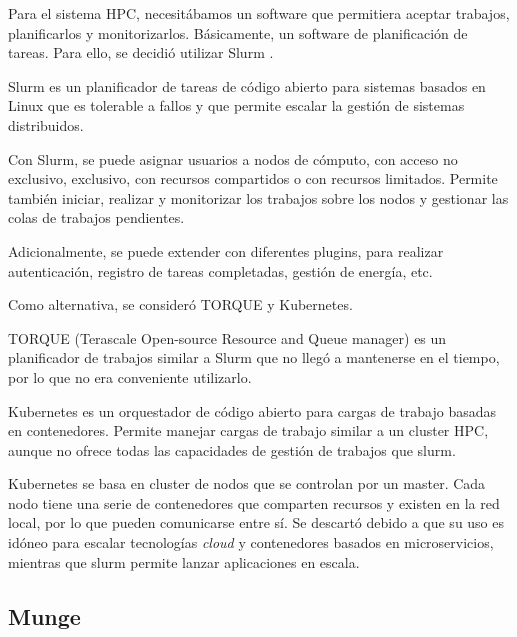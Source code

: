 Para el sistema HPC, necesitábamos un software que permitiera aceptar trabajos, planificarlos y monitorizarlos. Básicamente, un software de planificación de tareas. Para ello, se decidió utilizar Slurm \cite{slurmquickstart}.
\vspace{2mm}

Slurm es un planificador de tareas de código abierto \cite{slurmrepo} para sistemas basados en Linux que es tolerable a fallos y que permite escalar la gestión de sistemas distribuidos.
\vspace{2mm}

Con Slurm, se puede asignar usuarios a nodos de cómputo, con acceso no exclusivo, exclusivo, con recursos compartidos o con recursos limitados. Permite también iniciar, realizar y monitorizar los trabajos sobre los nodos y gestionar las colas de trabajos pendientes.
\vspace{2mm}

Adicionalmente, se puede extender con diferentes plugins, para realizar autenticación, registro de tareas completadas, gestión de energía, etc.
\vspace{2mm}

Como alternativa, se consideró TORQUE y Kubernetes.

\vspace{2mm}
TORQUE (Terascale Open-source Resource and Queue manager) \cite{torquerepo} es un planificador de trabajos similar a Slurm que no llegó a mantenerse en el tiempo, por lo que no era conveniente utilizarlo.

\vspace{2mm}
Kubernetes \cite{kubernetesrepo} es un orquestador de código abierto para cargas de trabajo basadas en contenedores. Permite manejar cargas de trabajo similar a un cluster HPC, aunque no ofrece todas las capacidades de gestión de trabajos que slurm. 

\vspace{2mm}
Kubernetes se basa en cluster de nodos que se controlan por un master. Cada nodo tiene una serie de contenedores que comparten recursos y existen en la red local, por lo que pueden comunicarse entre sí. Se descartó debido a que su uso es idóneo para escalar tecnologías \emph{cloud} y contenedores basados en microservicios, mientras que slurm permite lanzar aplicaciones en escala.

\subsection{Munge}

